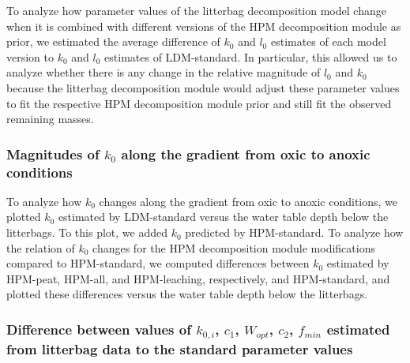 \documentclass[esd, manuscript]{copernicus}
\begin{document}
To analyze how parameter values of the litterbag decomposition model change when it is combined with different versions of the HPM decomposition module as prior, we estimated the average difference of \(k_0\) and \(l_0\) estimates of each model version to \(k_0\) and \(l_0\) estimates of LDM-standard. In particular, this allowed us to analyze whether there is any change in the relative magnitude of \(l_0\) and \(k_0\) because the litterbag decomposition module would adjust these parameter values to fit the respective HPM decomposition module prior and still fit the observed remaining masses.

\subsubsection{\texorpdfstring{Magnitudes of \(k_0\) along the gradient from oxic to anoxic conditions}{Magnitudes of k\_0 along the gradient from oxic to anoxic conditions}}

To analyze how \(k_0\) changes along the gradient from oxic to anoxic conditions, we plotted \(k_0\) estimated by LDM-standard versus the water table depth below the litterbags. To this plot, we added \(k_0\) predicted by HPM-standard. To analyze how the relation of \(k_0\) changes for the HPM decomposition module modifications compared to HPM-standard, we computed differences between \(k_0\) estimated by HPM-peat, HPM-all, and HPM-leaching, respectively, and HPM-standard, and plotted these differences versus the water table depth below the litterbags.

\subsubsection{\texorpdfstring{Difference between values of \(k_{0,i}\), \(c_1\), \(W_{opt}\), \(c_2\), \(f_{min}\) estimated from litterbag data to the standard parameter values}{Difference between values of k\_\{0,i\}, c\_1, W\_\{opt\}, c\_2, f\_\{min\} estimated from litterbag data to the standard parameter values}}
\end{document}
